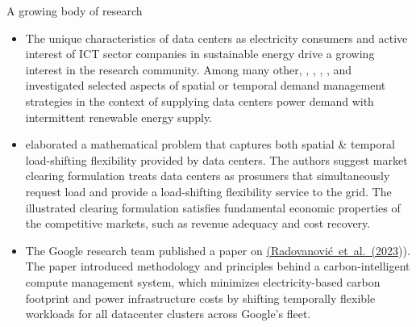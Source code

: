 \begin{frame}{A growing body of research}

  {\footnotesize
  \begin{itemize}

  \item The unique characteristics of data centers as electricity consumers and active interest of ICT sector companies in sustainable energy drive a growing interest in the research community. Among many other, , ,
  ,
  , and
   investigated selected aspects of spatial or temporal demand management strategies in the context of supplying data centers power demand with intermittent renewable energy supply. 
  
  \item {} elaborated a mathematical problem that captures both spatial \& temporal load-shifting flexibility provided by data centers. The authors suggest market clearing formulation treats data centers as prosumers that simultaneously request load and provide a load-shifting flexibility service to the grid. The illustrated clearing formulation satisfies fundamental economic properties of the competitive markets, such as revenue adequacy and cost recovery.

  \item The Google research team published a paper on  \href{https://doi.org/10.1109/TPWRS.2022.3173250}{(Radovanović~et~al.~(2023})). The paper introduced methodology and principles behind a carbon-intelligent compute management system, which minimizes electricity-based carbon footprint and power infrastructure costs by shifting temporally flexible workloads for all datacenter clusters across Google's fleet.

  \end{itemize}
  }

\end{frame}



